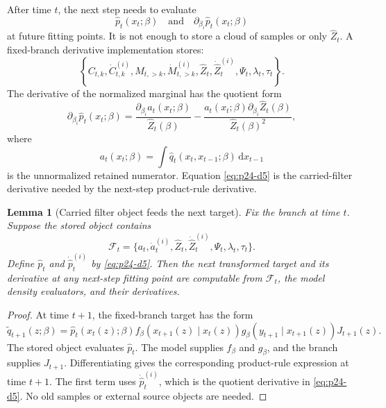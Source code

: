 \documentclass[11pt]{article}
\newtheorem{lemma}{Lemma}
\numberwithin{equation}{section}
\newcommand{\dd}{\,\mathrm d}
\begin{document}
After time \(t\), the next step needs to evaluate
\[
    \widehat p_t(x_t;\beta)
    \quad\text{and}\quad
    \partial_{\beta_i}\widehat p_t(x_t;\beta)
\]
at future fitting points.  It is not enough to store a cloud of samples or only
\(\widehat Z_t\).  A fixed-branch derivative implementation stores:
\begin{equation}
    \left\{
    C_{t,k},\dot C_{t,k}^{(i)},M_{t,>k},\dot M_{t,>k}^{(i)},
    \widehat Z_t,\dot{\widehat Z}_t^{(i)},
    \Psi_t,\lambda_t,\tau_t
    \right\}.
    \label{eq:p24-d4}
\end{equation}
The derivative of the normalized marginal has the quotient form
\begin{equation}
    \partial_{\beta_i}\widehat p_t(x_t;\beta)
    =
    \frac{\partial_{\beta_i}a_t(x_t;\beta)}{\widehat Z_t(\beta)}
    -
    \frac{a_t(x_t;\beta)\partial_{\beta_i}\widehat Z_t(\beta)}
    {\widehat Z_t(\beta)^2},
    \label{eq:p24-d5}
\end{equation}
where
\begin{equation}
    a_t(x_t;\beta)
    =
    \int \widehat q_t(x_t,x_{t-1};\beta)\dd x_{t-1}
    \label{eq:p24-d6}
\end{equation}
is the unnormalized retained numerator.  Equation \eqref{eq:p24-d5} is the carried-filter
derivative needed by the next-step product-rule derivative.

\begin{lemma}[Carried filter object feeds the next target]
Fix the branch at time \(t\).  Suppose the stored object contains
\[
    \mathcal F_t
    =
    \{a_t,\dot a_t^{(i)},\widehat Z_t,\dot{\widehat Z}_t^{(i)},
      \Psi_t,\lambda_t,\tau_t\}.
\]
Define \(\widehat p_t\) and \(\dot{\widehat p}_t^{(i)}\) by \eqref{eq:p24-d5}.  Then the
next transformed target and its derivative at any next-step fitting point are
computable from \(\mathcal F_t\), the model density evaluators, and their
derivatives.
\end{lemma}

\begin{proof}
At time \(t+1\), the fixed-branch target has the form
\[
    \widetilde q_{t+1}(z;\beta)
    =
    \widehat p_t(x_t(z);\beta)
    f_\beta(x_{t+1}(z)\mid x_t(z))
    g_\beta(y_{t+1}\mid x_{t+1}(z))
    J_{t+1}(z).
\]
The stored object evaluates \(\widehat p_t\).  The model supplies \(f_\beta\)
and \(g_\beta\), and the branch supplies \(J_{t+1}\).  Differentiating gives
the corresponding product-rule expression at time \(t+1\).  The first
term uses \(\dot{\widehat p}_t^{(i)}\), which is the quotient derivative in
\eqref{eq:p24-d5}.  No old samples or external source objects are needed.
\end{proof}
\end{document}
